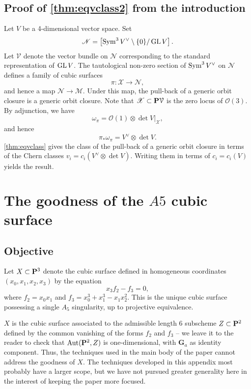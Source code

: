 \documentclass[12pt,reqno]{amsart}
\renewcommand{\to}{{\longrightarrow}}
\numberwithin{equation}{section}
\renewcommand{\O}{\mathcal O}
\newcommand{\G}{\mathbf G}
\begin{document}
\subsection{Proof of \texorpdfstring{\autoref{thm:eqvclass2}}{second theorem} from the introduction}\label{proof:eqvclass2}
Let $V$ be a 4-dimensional vector space.
Set
\[\mathscr N = \left[ \Sym^3V^\vee \setminus \{0\} / \GL V \right]. \]
Let $\mathcal V$ denote the vector bundle on $\mathscr N$ corresponding to the standard representation of $\GL V$.
The tautological non-zero section of $\Sym^3V^\vee$ on $\mathscr N$ defines a family of cubic surfaces
\[ \pi \colon \mathscr X \to \mathscr N,\]
and hence a map $\mathscr N \to \mathscr M$.
Under this map, the pull-back of a generic orbit closure is a generic orbit closure.
Note that $\mathscr X \subset \P \mathcal V$ is the zero locus of $\O(3)$.
By adjunction, we have
\[ \omega_\pi = \O(1) \otimes \det V |_{\mathscr X},\]
and hence
\[ \pi_* \omega_\pi = V^\vee \otimes \det V.\]
\autoref{thm:eqvclass} gives the class of the pull-back of a generic orbit closure in terms of the Chern classes $v_i = c_i(V^\vee \otimes \det V)$.
Writing them in terms of $c_i = c_i(V)$ yields the result.

\appendix



\section{The goodness of the $A5$ cubic surface}
\label{sec:goodnessA5}

\subsection{Objective}
Let $X \subset \P^{3}$ denote the cubic surface defined in homogeneous
coordinates $\left(x_{0}, x_{1}, x_{2}, x_{3}\right)$ by the equation
\[x_{3}f_{2} - f_{3} = 0,\] where $f_{2} = x_{0}x_{1}$ and
$f_{3} = x_{0}^3 + x_{1}^{3}-x_{1}x_{2}^{2}$.  This is the unique
cubic surface possessing a single $A_5$ singularity, up to projective
equivalence.

$X$ is the cubic surface associated to the admissible length $6$
subscheme $Z \subset \P^{2}$ defined by the common vanishing of the
forms $f_{2}$ and $f_{3}$ -- we leave it to the reader to check that
$\Aut(\P^{2},Z)$ is one-dimensional, with $\G_{a}$ as identity
component.  Thus, the techniques used in the main body of the paper
cannot address the goodness of $X$.  The techniques developed in this
appendix most probably have a larger scope, but we have not pursued
greater generality here in the interest of keeping the paper more
focused.
\end{document}
